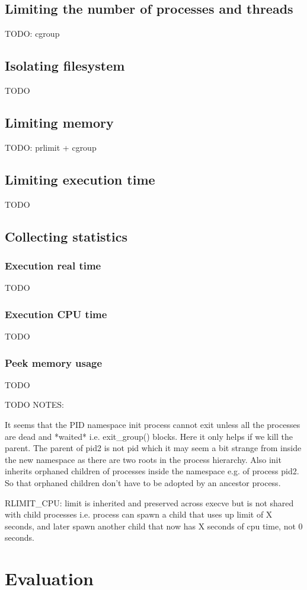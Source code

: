 \documentclass[en]{pracamgr}
\begin{document}
\section{Limiting the number of processes and threads}
TODO: cgroup

\section{Isolating filesystem}
TODO

\section{Limiting memory}
TODO: prlimit + cgroup

\section{Limiting execution time}
TODO

\section{Collecting statistics}

\subsection{Execution real time}
TODO

\subsection{Execution CPU time}
TODO

\subsection{Peek memory usage}
TODO


TODO NOTES:

It seems that the PID namespace init process cannot exit unless all the processes are dead and *waited* i.e. exit\_group() blocks. Here it only helps if we kill the parent. The parent of pid2 is not pid which it may seem a bit strange from inside the new namespace as there are two roots in the process hierarchy. Also init inherits orphaned children of processes inside the namespace e.g. of process pid2. So that orphaned children don't have to be adopted by an ancestor process.

RLIMIT\_CPU: limit is inherited and preserved across execve but is not shared with child processes i.e. process can spawn a child that uses up limit of X seconds, and later spawn another child that now has X seconds of cpu time, not 0 seconds.

\chapter{Evaluation} \label{chapter:evaluation}

\fi

\printbibliography
\end{document}
